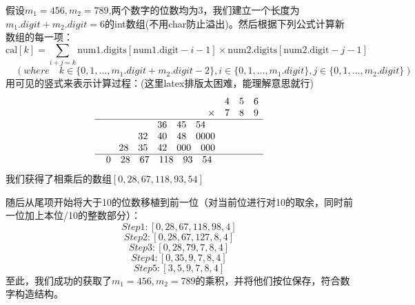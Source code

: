 \documentclass[11pt]{article}
\begin{document}
假设$m_1 = 456, m_2 = 789$,两个数字的位数均为3，我们建立一个长度为$m_1.digit+m_2.digit = 6$的int数组(不用char防止溢出)。然后根据下列公式计算新数组的每一项：
$$
\text{cal}[k] = \sum_{i+j=k} \text{num1.digits}[\text{num1.digit} - i - 1] \times \text{num2.digits}[\text{num2.digit} - j - 1]
$$
$$
\quad (where\quad k \in \{0,1,\dots,m_1.digit+m_2.digit-2\},i\in \{0,1,\dots,m_1.digit\},j\in \{0,1,\dots,m_2.digit\})
$$
用可见的竖式来表示计算过程：(这里latex排版太困难，能理解意思就行)
\[
\begin{array}{r@{\quad}l}
      & 4\quad 5\quad6 \\
\times & 7\quad 8\quad9 \\
\hline
 36 \quad 45 \quad 54 \quad \\
 \quad 32 \quad 40 \quad 48 \quad 0000 \\
\quad \quad 28 \quad 35 \quad 42 \quad 000\quad 000 \\
\hline
 0\quad28 \quad 67\quad 118 \quad 93 \quad 54 \
\end{array}
\]
我们获得了相乘后的数组$[0,28,67,118,93,54]$


随后从尾项开始将大于10的位数移植到前一位（对当前位进行对10的取余，同时前一位加上本位/10的整数部分）：
$$Step 1:[0,28,67,118,98,4]$$
$$Step 2:[0,28,67,127,8,4]$$
$$Step 3:[0,28,79,7,8,4]$$
$$Step 4:[0,35,9,7,8,4]$$
$$Step 5:[3,5,9,7,8,4]$$
至此，我们成功的获取了$m_1 = 456, m_2 = 789$的乘积，并将他们按位保存，符合数字构造结构。
\end{document}
